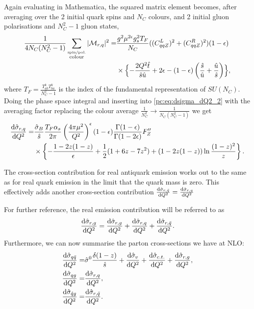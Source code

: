 \documentclass[../main.tex]{subfiles}
\begin{document}
Again evaluating in Mathematica, the squared matrix element becomes, after averaging over the 2 initial quark spins and \(N_C\) colours, and 2 initial gluon polarisations and \(N_C^2-1\) gluon states,
\begin{align}
  \nonumber
  \frac{1}{4N_C(N_C^2-1)} \sum_{\stackrel{\text{spin/pol.}}{\text{colour}}}|\M_{r,q}|^2 = & \frac{g^2 \mu^{2\epsilon} g_s^2 T_F}{N_C} ((C_{qqZ}^L)^2 + (C_{qqZ}^R)^2) (1-\epsilon) \\
                                                                                          & \times\Bigl\{
  -\frac{2Q^2 \hat{t}}{\hat{s} \hat{u}} + 2\epsilon - (1-\epsilon)\pclosed{\frac{\hat{s}}{\hat{u}} + \frac{\hat{u}}{\hat{s}}}
  \Bigr\},
\end{align}
where \(T_F = \frac{T^k_{ab} T^{k}_{ba}}{N_C^2-1}\) is the index of the fundamental representation of \(SU(N_C)\).
Doing the phase space integral and inserting into \cref{pc:eq:dsigma_dQ2_2} with the averaging factor replacing the colour average \(\frac{1}{N_C^2} \to \frac{1}{N_C(N_C^2-1)}\) we get
\begin{align}
  \label{pc:eq:sigma_qg}
  \nonumber
  \d[Q^2]{\hat\sigma_{r,q}} = & \frac{\hat\sigma_B}{\hat{s}} \frac{T_F \alpha_s}{2\pi} \pclosed{\frac{4\pi \mu^2}{Q^2}}^\epsilon (1-\epsilon) \frac{\Gamma(1-\epsilon)}{\Gamma(1-2\epsilon)} F^{\prime\prime}_Z \\
                              & \times \cclosed{-\frac{1-2z(1-z)}{\epsilon} + \frac{1}{2}(1+6z-7z^2) + (1-2z(1-z))\ln\frac{(1-z)^2}{z}}.
\end{align}

The cross-section contribution for real antiquark emission works out to the same as for real quark emission in the limit that the quark mass is zero.
This effectively adds another cross-section contribution \(\d[Q^2]{\hat\sigma_{r,\bar{q}}} = \d[Q^2]{\hat\sigma_{r,q}}\)

For further reference, the real emission contribution will be referred to as
\begin{equation}
  \d[Q^2]{\hat\sigma_{r,g}} = \d[Q^2]{\hat\sigma_{r,g}} + \d[Q^2]{\hat\sigma_{r,q}} + \d[Q^2]{\hat\sigma_{r,\bar{q}}}.
\end{equation}
Furthermore, we can now summarise the parton cross-sections we have at NLO\@:
\begin{subequations}
  \begin{align}
    \d[Q^2]{\hat\sigma_{q\bar{q}}} = & \hat\sigma^0 \frac{\delta(1-z)}{\hat{s}} + \d[Q^2]{\hat\sigma_v} + \d[Q^2]{\hat\sigma_{c.t.}} + \d[Q^2]{\hat\sigma_{r,g}}, \\
    \d[Q^2]{\hat\sigma_{qg}} =       & \d[Q^2]{\hat\sigma_{r,q}},                                                                                                 \\
    \d[Q^2]{\hat\sigma_{\hat{q}g}} = & \d[Q^2]{\hat\sigma_{r,\bar{q}}}.
  \end{align}
\end{subequations}
\end{document}
